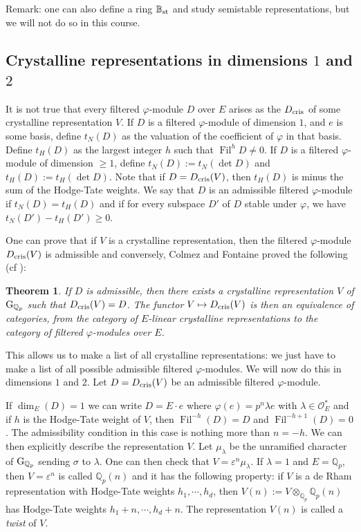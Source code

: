 \documentclass[11pt]{amsart}
\def\Q{{\mathbb Q}_p}
\def\g{{\rm G}_{\Q}}
\def\O{{\mathcal O}_E}
\def\Qp{{\mathbb Q}_p}
\def\eps{\varepsilon}
\def\bst{\mathbb{B}_{\rm st}}
\def\dcris{D_{\rm cris}}
\def\on{\operatorname}
\newtheorem{thm}[definit]{\bf{Theorem}}
\begin{document}
Remark: one can also define a ring $\bst$ and study semistable 
representations, but we will not do so in this course. 
 
\subsection{Crystalline representations in dimensions $1$ and $2$} 
It is not true that every filtered $\varphi$-module $D$ over $E$ 
arises as the 
$\dcris$ of some crystalline representation $V$. If $D$ is a filtered 
$\varphi$-module of dimension $1$, and $e$ is some basis,  
define $t_N(D)$ as the valuation of the coefficient of $\varphi$ in that 
basis. Define $t_H(D)$ as the largest integer $h$ such that 
$\on{Fil}^h D \neq 0$. If $D$ is a filtered 
$\varphi$-module of dimension $\geq 1$, define $t_N(D):=t_N(\det D)$ and 
$t_H(D):=t_H(\det D)$. Note that if $D=\dcris(V)$, then $t_H(D)$ is 
minus the sum of the Hodge-Tate weights. 
We say that $D$ is an admissible filtered 
$\varphi$-module if $t_N(D)=t_H(D)$ and if for every subspace $D'$ of $D$ 
stable under $\varphi$, we have $t_N(D')-t_H(D') \geq 0$.  
 
One can prove that if $V$ is a crystalline representation, then 
the filtered $\varphi$-module  
$\dcris(V)$ is admissible and conversely, Colmez and Fontaine proved 
the following (cf \cite{CF00}): 
\begin{thm}\label{colfont} 
If $D$ is admissible, then there exists a crystalline 
representation $V$ of $\g$ such that $\dcris(V)=D$.  
The functor $V \mapsto \dcris(V)$ is then an equivalence of 
categories, from the category of $E$-linear  
crystalline representations to the 
category of filtered $\varphi$-modules over $E$.  
\end{thm} 
 
This allows us to make a list of all crystalline representations: we 
just have to make a list of all possible admissible filtered 
$\varphi$-modules. We will now do this in dimensions $1$ and $2$. Let 
$D = \dcris(V)$ be an admissible filtered $\varphi$-module. 
 
If $\dim_E(D) = 1$ we can write $D = E \cdot e$ 
where $\varphi(e)=p^n \lambda e$ with $\lambda \in \O^*$ and if $h$ is 
the Hodge-Tate weight of $V$, then $\on{Fil}^{-h}(D)=D$ and  
$\on{Fil}^{-h+1}(D)=0$. The admissibility condition in this case is 
nothing more than $n=-h$. We can then explicitly describe the 
representation $V$. Let $\mu_{\lambda}$ be the unramified character of 
$\g$ sending $\sigma$ to $\lambda$. One can then check that $V=\eps^n 
\mu_\lambda$. If $\lambda=1$ and $E=\Qp$,  
then $V=\eps^n$ is called $\Qp(n)$ and 
it has the following property: if $V$ is a de Rham representation with 
Hodge-Tate weights $h_1,\cdots,h_d$, then $V(n):=V \otimes_{\Qp} 
\Qp(n)$  has Hodge-Tate weights $h_1+n,\cdots,h_d+n$. The 
representation $V(n)$ is called a \emph{twist} of $V$. 
 
\end{document}
